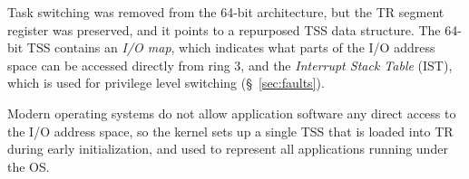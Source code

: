 Task switching was removed from the 64-bit architecture, but the TR segment
register was preserved, and it points to a repurposed TSS data structure. The
64-bit TSS contains an \textit{I/O map}, which indicates what parts of the I/O
address space can be accessed directly from ring 3, and the
\textit{Interrupt Stack Table} (IST), which is used for privilege level
switching (\S~\ref{sec:faults}).

Modern operating systems do not allow application software any direct access to
the I/O address space, so the kernel sets up a single TSS that is loaded into
TR during early initialization, and used to represent all applications running
under the OS.
